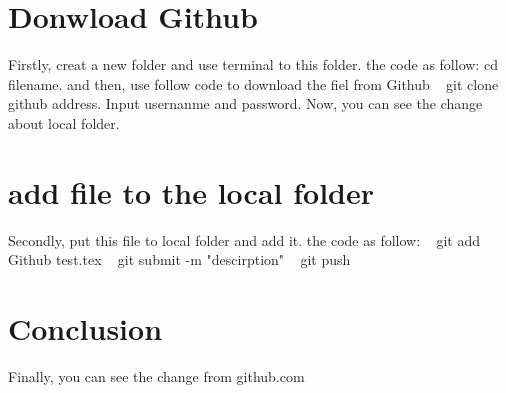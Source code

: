 \documentclass[11pt, a4paper]{article}
\begin{document}
\section{Donwload Github}
Firstly, creat a new folder and use terminal to this folder. the code as follow:
cd {filename}.
and then, use follow code to download the fiel from Github
~ git clone {github address}.
Input usernanme and password.
Now, you can see the change about local folder.
\section{add file to the local folder}
Secondly, put this file to local folder and add it.
the code as follow:
~ git add Github test.tex
~ git submit -m "descirption"
~ git push
\section{Conclusion}
Finally, you can see the change from github.com
\end{document}
